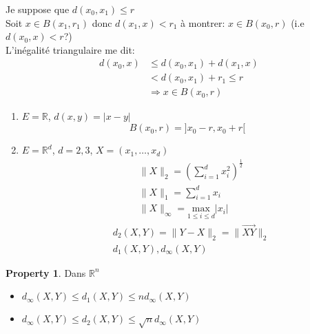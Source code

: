 \documentclass[a4paper]{report}
\newcommand\R{\ensuremath{\mathbb{R}}}
\let\implies\Rightarrow
\theoremstyle{definition}
\newtheorem*{property}{Property}
\begin{document}
\begin{explanation}
   Je suppose que $d(x_0, x_1) \le r$\\ 
   Soit $x \in B(x_1, r_1)$ donc $d(x_1, x) < r_1$ à montrer: $x \in B(x_0, r)$ (i.e $d(x_0, x) < r$?)\\
   L'inégalité triangulaire me dit:
   \begin{align*}
       d(x_0, x) &\le d(x_0, x_1) + d(x_1, x)\\
                 &< d(x_0, x_1) + r_1 \le r\\
                 &\implies x \in B(x_0, r)
   \end{align*}
\end{explanation}
\begin{eg}
   \begin{enumerate}
       \item $E = \R$, \quad  $d(x, y) = |x - y|$
            \[
                B(x_0, r) = ]x_0 -r, x_0 + r[
           \] 
       \item $E = \R^d$, \quad $d = 2,3$, \quad $X = (x_1, \ldots, x_d)$ 
           \begin{align*}
               &\|X\|_2 = \left( \sum_{i=1}^{d} x_i^2 \right)^{\frac{1}{2}} \\
               &\|X\|_1 = \sum_{i=1}^{d} x_i\\
               &\|X\|_{\infty} = \underset{1 \le i \le d}{\text{max}}|x_i|
           \end{align*}
           \begin{align*}
              &d_2(X, Y) = \|Y - X\|_2 = \|\vec{XY}\|_2\\ 
              &d_1(X, Y), d_{\infty}(X, Y)
           \end{align*}
   \end{enumerate} 
\end{eg}
\begin{property} Dans $\R^n$
   \begin{itemize}
       \item $d_{\infty}(X, Y) \le d_1(X, Y) \le n d_{\infty}(X, Y)$
       \item $d_{\infty}(X, Y) \le d_2(X, Y) \le \sqrt{n} d_{\infty}(X, Y)$
   \end{itemize} 
\end{property}
\end{document}
